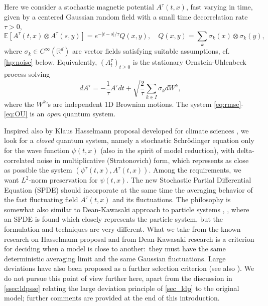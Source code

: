 \documentclass[a4paper,10pt]{amsart}
\theoremstyle{remark}
\numberwithin{equation}{section}
\begin{document}
Here we consider a stochastic magnetic potential $A^{\tau}\left(  t,x\right) $, fast varying in time, given by a centered Gaussian random field with a small time decorrelation rate $\tau>0$,
\begin{equation*}
    \mathbb{E}[A^{\tau}(t,x)\otimes A^{\tau}(s,y)]=e^{-|t-s|/\tau}Q(x,y),\quad
Q(x,y)=\sum_{k}\sigma_{k}(x)\otimes\sigma_{k}(y),
\end{equation*}
where $\sigma_{k}\in C^{\infty}(\mathbb{R}^{d})$ are vector fields satisfying suitable assumptions, cf. \cref{hp:noise} below. Equivalently, $(A^{\tau}_t)_{t\geq 0}$ is the stationary Ornstein-Uhlenbeck process solving
\begin{equation}
dA^{\tau}=-\frac{1}{\tau}A^{\tau}dt+\sqrt{\frac{2}{\tau}}\sum_{k\in I}%
\sigma_{k}dW^{k},\label{eq:OU}%
\end{equation}
where the $W^{k}$'s are independent 1D Brownian motions. The system
\eqref{eq:rmse}-\eqref{eq:OU} is an \textit{open} quantum system.

Inspired also by Klaus Hasselmann proposal developed for climate sciences
\cite{Has}, we look for a \textit{closed} quantum system, namely a stochastic
Schr\"{o}dinger equation only for the wave function $\psi\left(  t,x\right)  $
(also in the spirit of model reduction), with delta-correlated noise in
multiplicative (Stratonovich) form, which represents as close as possible the
system $\left(  \psi^{\tau}\left(  t,x\right)  ,A^{\tau}\left(  t,x\right)
\right)  $. Among the requirements, we want $L^{2}$-norm preservation for
$\psi\left(  t,x\right)  $. The new Stochastic Partial Differential Equation
(SPDE) should incorporate at the same time the averaging behavior of the fast
fluctuating field $A^{\tau}\left(  t,x\right)  $ and its fluctuations. The
philosophy is somewhat also similar to Dean-Kawasaki approach to particle
systems \cite{CorFis}, \cite{DirFeh}, \cite{DjuKre} where an SPDE is found
which closely represents the particle system, but the formulation and
techniques are very different. What we take from the known research on Hasselmann proposal \cite{Arn} and from Dean-Kawasaki research is a criterion for deciding when a model is close to another:\ they must have the same deterministic averaging limit and the same Gaussian fluctuations. Large deviations have also been proposed as a further selection criterion \cite{Arn,fehrman2023non} (see also \cite{BerDes}). We do not pursue this point of view further here, apart from the discussion in \autoref{ssec:ldpsse} relating the large deviation principle of \autoref{sec_ldp} to the original model; further comments are provided at the end of this introduction.
\end{document}
